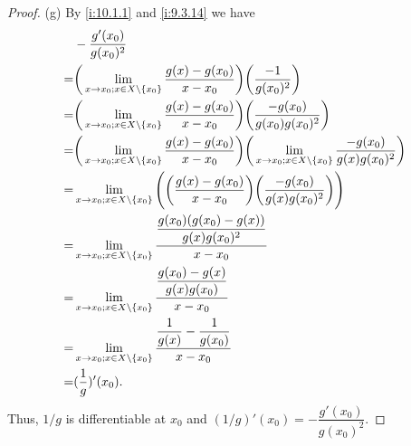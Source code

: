 \begin{proof}{(g)}
  By \cref{i:10.1.1} and \cref{i:9.3.14} we have
  \begin{align*}
      & -\dfrac{g'(x_0)}{g(x_0)^2}                                                                                                                                                          \\
    = & \bigg(\lim_{x \to x_0 ; x \in X \setminus \left\lbrace x_0\right\rbrace} \dfrac{g(x) - g(x_0)}{x - x_0}\bigg) \bigg(\dfrac{-1}{g(x_0)^2}\bigg)                                                          \\
    = & \bigg(\lim_{x \to x_0 ; x \in X \setminus \left\lbrace x_0\right\rbrace} \dfrac{g(x) - g(x_0)}{x - x_0}\bigg) \bigg(\dfrac{-g(x_0)}{g(x_0) g(x_0)^2}\bigg)                                              \\
    = & \bigg(\lim_{x \to x_0 ; x \in X \setminus \left\lbrace x_0\right\rbrace} \dfrac{g(x) - g(x_0)}{x - x_0}\bigg) \bigg(\lim_{x \to x_0 ; x \in X \setminus \left\lbrace x_0\right\rbrace} \dfrac{-g(x_0)}{g(x) g(x_0)^2}\bigg) \\
    = & \lim_{x \to x_0 ; x \in X \setminus \left\lbrace x_0\right\rbrace} \Bigg(\bigg(\dfrac{g(x) - g(x_0)}{x - x_0}\bigg) \bigg(\dfrac{-g(x_0)}{g(x) g(x_0)^2}\bigg)\Bigg)                                    \\
    = & \lim_{x \to x_0 ; x \in X \setminus \left\lbrace x_0\right\rbrace} \dfrac{\dfrac{g(x_0)(g(x_0) - g(x))}{g(x) g(x_0)^2}}{x - x_0}                                                                        \\
    = & \lim_{x \to x_0 ; x \in X \setminus \left\lbrace x_0\right\rbrace} \dfrac{\dfrac{g(x_0) - g(x)}{g(x) g(x_0)}}{x - x_0}                                                                                  \\
    = & \lim_{x \to x_0 ; x \in X \setminus \left\lbrace x_0\right\rbrace} \dfrac{\dfrac{1}{g(x)} - \dfrac{1}{g(x_0)}}{x - x_0}                                                                                 \\
    = & (\dfrac{1}{g})'(x_0).
  \end{align*}
  Thus, \(1 / g\) is differentiable at \(x_0\) and \((1 / g)'(x_0) = -\dfrac{g'(x_0)}{g(x_0)^2}\).
\end{proof}

